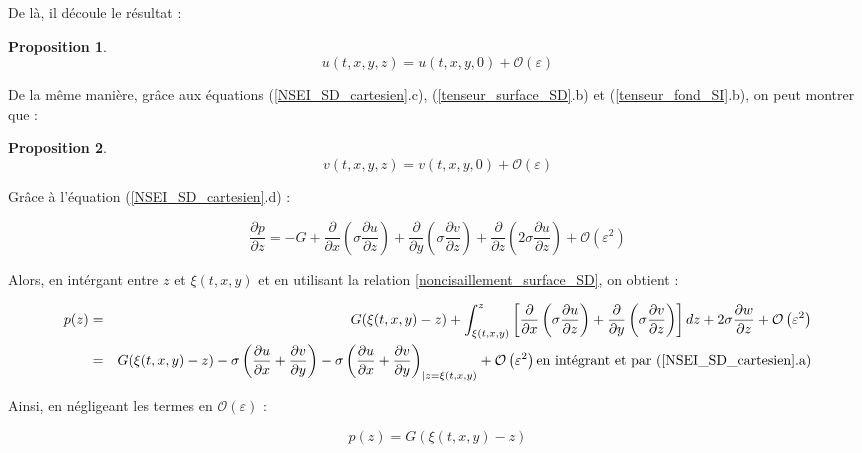 \documentclass[10pt,a4paper]{amsart}
\newtheorem{proposition}{Proposition}
\def\gint{\displaystyle\int}
\begin{document}
De là, il découle le résultat :

\begin{proposition}\label{prop_variation_u}
\begin{equation}
u(t,x,y,z)=u(t,x,y,0)+\mathcal{O} \left( \varepsilon \right)
\end{equation}
\end{proposition}

De la même manière, grâce aux équations (\ref{NSEI_SD_cartesien}.c), (\ref{tenseur_surface_SD}.b) et (\ref{tenseur_fond_SI}.b), on peut montrer que :

\begin{proposition}\label{prop_variation_v}
\begin{equation}
v(t,x,y,z)=v(t,x,y,0)+\mathcal{O} \left( \varepsilon \right)
\end{equation}
\end{proposition}

Grâce à l'équation (\ref{NSEI_SD_cartesien}.d) :

$$ \dfrac{\partial p}{\partial z} = - G + \dfrac{\partial}{\partial x} \left( \sigma \dfrac{\partial u}{\partial z} \right) + \dfrac{\partial}{\partial y} \left( \sigma \dfrac{\partial v}{\partial z} \right) + \dfrac{\partial}{\partial z} \left( 2 \sigma \dfrac{\partial u}{\partial z} \right) + \mathcal{O}\left( \varepsilon^2 \right)$$

Alors, en intérgant entre $z$ et $\xi(t,x,y)$ et en utilisant la relation \eqref{noncisaillement_surface_SD}, on obtient :

\begin{eqnarray*}
p(z) & = & G(\xi(t,x,y) - z ) + \gint_{\xi(t,x,y)}^z \left[ \dfrac{\partial}{\partial x} \left( \sigma \dfrac{\partial u}{\partial z} \right) + \dfrac{\partial}{\partial y} \left( \sigma \dfrac{\partial v}{\partial z} \right) \right] dz + 2 \sigma \dfrac{\partial w}{\partial z} + \mathcal{O} \left( \varepsilon^2 \right)\\
     & = & G(\xi(t,x,y) - z ) - \sigma \left( \dfrac{\partial u}{\partial x} + \dfrac{\partial v}{\partial y} \right) - \sigma \left( \dfrac{\partial u}{\partial x} + \dfrac{\partial v}{\partial y} \right)_{| z=\xi(t,x,y)} + \mathcal{O} \left( \varepsilon^2 \right) \text{en intégrant et par (\ref{NSEI_SD_cartesien}.a)}
\end{eqnarray*}

Ainsi, en négligeant les termes en $\mathcal{O} \left( \varepsilon \right)$ :

\begin{equation}\label{hyp_hydrostatique_ordre1}
p(z) = G(\xi(t,x,y) - z )
\end{equation}
\end{document}
